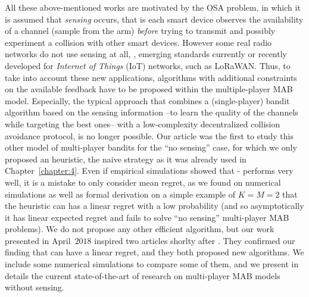 All these above-mentioned works are motivated by the OSA problem, in which it is assumed that \emph{sensing} occurs, that is each smart device observes the availability of a channel (sample from the arm) \emph{before} trying to transmit and possibly experiment a collision with other smart devices.
However some real radio networks do not use sensing at all, \eg, emerging standards currently or recently developed for \emph{Internet of Things} (IoT) networks, such as LoRaWAN.
Thus, to take into account these new applications, algorithms with additional constraints on the available feedback have to be proposed within the multiple-player MAB model.
Especially, the typical approach that combines a (single-player) bandit algorithm based on the sensing information --to learn the quality of the channels while targeting the best ones-- with a low-complexity decentralized collision avoidance protocol, is no longer possible.
%
Our article \cite{Besson2018ALT} was the first to study this other model of multi-player bandits for the ``no sensing'' case,
for which we only proposed an heuristic, the naive \Selfish{} strategy as it was already used in Chapter~\ref{chapter:4}.
Even if empirical simulations showed that \Selfish-\klUCB{} performs very well, it is a mistake to only consider mean regret, as we found on numerical simulations as well as formal derivation on a simple example of $K=M=2$ that the \Selfish{} heuristic can has a linear regret with a low probability (and so asymptotically it has linear expected regret and fails to solve ``no sensing'' multi-player MAB problems).
We do not propose any other efficient algorithm, but our work presented in April~$2018$ inspired two articles shorlty after \cite{LugosiMehrabian18,BoursierPerchet18}.
They confirmed our finding that \Selfish{} can have a linear regret, and they both proposed new algorithms.
We include some numerical simulations to compare some of them, and we present in details the current state-of-the-art of research on multi-player MAB models without sensing.


